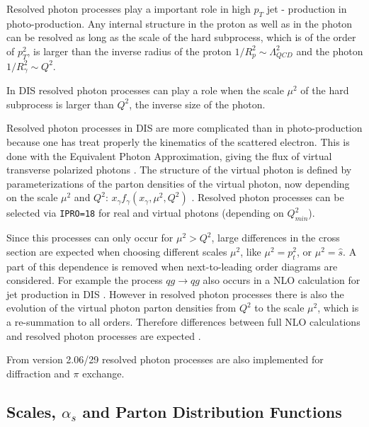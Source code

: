 \documentclass[10pt]{article} \usepackage{dina4}
\newcommand{\RAPGAPMC}{RAPGAP32}
\begin{document}
Resolved photon processes play a important role 
in high $p_T$ jet - production in photo-production. 
Any internal
structure in the proton as well as in the photon can be resolved as long
as the scale of the hard subprocess, which is of the order of $p_T^2$,
is larger than the inverse radius of the proton 
$1/R^2_p \sim \Lambda_{QCD}^2$
 and the photon 
$1/R^2_{\gamma} \sim Q^2$.
\par
In DIS resolved photon processes \cite{Chyla_res_gamma}
can play a role when the scale $\mu^2$
 of the
hard subprocess is larger than $Q^2$, the inverse size of the photon. 
\par
Resolved photon processes in DIS 
are more complicated than in photo-production because one has treat properly
the kinematics of the scattered electron. This is done with the
Equivalent Photon Approximation, giving the flux of virtual transverse 
polarized photons \cite{\RAPGAPMC}. The structure
of the virtual photon is defined by parameterizations of the parton densities
of the virtual photon, now depending on the scale $\mu^2$ and $Q^2$:
$x_{\gamma} f_{\gamma}(x_{\gamma},\mu^2,Q^2)$ 
\cite{GRS,Sasgam,Drees_Godbole}. Resolved photon processes can be selected via
\verb+IPRO=18+ for real and virtual photons (depending on $Q^2_{min}$).
\par
Since this processes can only occur for $\mu^2 > Q^2$, large differences
in the cross section are expected when choosing different scales $\mu^2$,
 like
$\mu^2=p_t^2$, or $\mu^2=\hat{s}$. 
A part of this dependence is removed when
next-to-leading order diagrams are considered. For example the process
$qg \rightarrow qg$ also occurs in a NLO calculation for jet production
in DIS \cite{Mirkes_nlo,catani_nlo,Kramer_res_gamma}. 
However in resolved photon processes there is 
also the evolution of the virtual photon parton densities from $Q^2$ to 
the scale $\mu^2$, which is a re-summation to all orders. Therefore 
differences between full NLO calculations and resolved photon processes
are expected \cite{Kramer_res_gamma}. 
\par
From version 2.06/29 resolved photon processes are also 
implemented for diffraction and $\pi$ exchange.
\subsection{Scales, $\alpha_s$ and Parton Distribution Functions}
\end{document}
